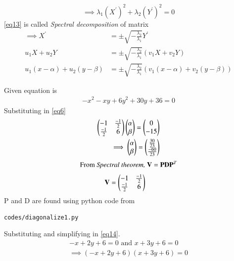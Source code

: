 \documentclass[journal,12pt,twocolumn]{IEEEtran}
\begin{document}
\begin{equation}\label{eq13}
	\implies \lambda_1 (X^\prime)^2 + \lambda_2 (Y^\prime)^2 = 0
\end{equation}
\eqref{eq13} is called \textit{Spectral decomposition} of matrix
\begin{align}
	\implies X^\prime &= \pm \sqrt{-\frac{\lambda_2}{\lambda_1}}Y^\prime\\	
	u_1X + u_2Y &= \pm \sqrt{-\frac{\lambda_2}{\lambda_1}}(v_1X + v_2Y)\\
	\label{eq14}u_1(x-\alpha) + u_2(y-\beta) &= \pm \sqrt{-\frac{\lambda_2}{\lambda_1}}(v_1(x-\alpha) + v_2(y-\beta))
\end{align}

Given equation is
\begin{align}
	-x^2-xy+6y^2+30y+36=0
\end{align}
Substituting in \eqref{eq6}
\begin{align}
	\label{eq16}\myvec{ -1 & \frac{-1}{2}\\\frac{-1}{2} & 6}\myvec{\alpha \\ \beta} = \myvec{0 \\ -15} \\
	\label{eq17}\implies \myvec{\alpha \\ \beta} = \myvec{\frac{30}{23} \\ \frac{-60}{23}}
\end{align}
\begin{equation}
	\text{From \textit{Spectral theorem, }}\vec{V} = \vec{P}\vec{D}\vec{P}^T
\end{equation}
\begin{align}
	\label{eq18}\vec{V} &= \myvec{ -1 & \frac{-1}{2}\\\frac{-1}{2} & 6}
\end{align}
P and D are found using python code from
\begin{lstlisting}
codes/diagonalize1.py
\end{lstlisting}
Substituting and simplifying in \ref{eq14}.
\begin{align}
	\label{eq22}-x + 2y + 6 = 0 \text{ and } x + 3y + 6 = 0\\
	\implies (-x + 2y + 6)(x + 3y + 6) = 0
\end{align}
\end{document}
